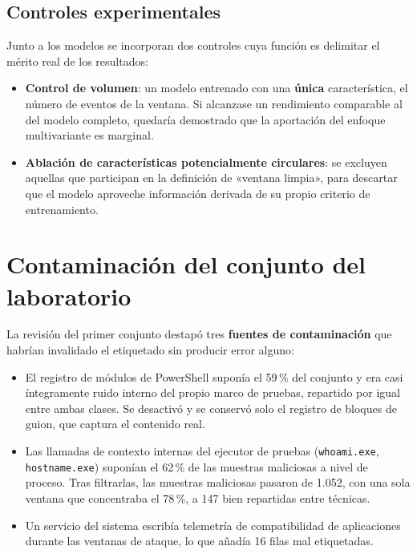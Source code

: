 \subsection{Controles experimentales}

Junto a los modelos se incorporan dos controles cuya función es delimitar el mérito real de
los resultados:

\begin{itemize}
    \item \textbf{Control de volumen}: un modelo entrenado con una \textbf{única}
    característica, el número de eventos de la ventana. Si alcanzase un rendimiento comparable
    al del modelo completo, quedaría demostrado que la aportación del enfoque multivariante es
    marginal.
    \item \textbf{Ablación de características potencialmente circulares}: se excluyen aquellas
    que participan en la definición de «ventana limpia», para descartar que el modelo
    aproveche información derivada de su propio criterio de entrenamiento.
\end{itemize}

\section{Contaminación del conjunto del laboratorio}
\label{anx:laboratorio}

La revisión del primer conjunto destapó tres \textbf{fuentes de contaminación} que habrían
invalidado el etiquetado sin producir error alguno:

\begin{itemize}
    \item El registro de módulos de PowerShell suponía el 59\,\% del conjunto y era casi
    íntegramente ruido interno del propio marco de pruebas, repartido por igual entre ambas
    clases. Se desactivó y se conservó solo el registro de bloques de guion, que captura el
    contenido real.
    \item Las llamadas de contexto internas del ejecutor de pruebas (\texttt{whoami.exe},
    \texttt{hostname.exe}) suponían el 62\,\% de las muestras maliciosas a nivel de proceso.
    Tras filtrarlas, las muestras maliciosas pasaron de 1.052, con una sola ventana que
    concentraba el 78\,\%, a 147 bien repartidas entre técnicas.
    \item Un servicio del sistema escribía telemetría de compatibilidad de aplicaciones
    durante las ventanas de ataque, lo que añadía 16 filas mal etiquetadas.
\end{itemize}

